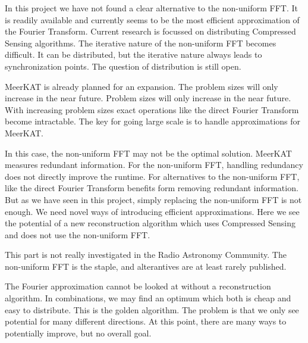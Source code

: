 In this project we have not found a clear alternative to the non-uniform FFT. It is readily available\cite{kunisnonequispaced, offringa2014wsclean} and currently seems to be the most efficient approximation of the Fourier Transform.
 Current research is focussed on distributing Compressed Sensing algorithms\cite{dabbech2018cygnus, pratley2018fast}. The iterative nature of the non-uniform FFT becomes difficult. It can be distributed\cite{kunisnonequispaced}, but the iterative nature always leads to synchronization points. The question of distribution is still open.

MeerKAT is already planned for an expansion. The problem sizes will only increase in the near future. Problem sizes will only increase in the near future. With increasing problem sizes exact operations like the direct Fourier Transform become intractable. The key for going large scale is to handle approximations for MeerKAT.

In this case, the non-uniform FFT may not be the optimal solution. MeerKAT measures redundant information. For the non-uniform FFT, handling redundancy does not directly improve the runtime. For alternatives to the non-uniform FFT, like the direct Fourier Transform benefits form removing redundant information. But as we have seen in this project, simply replacing the non-uniform FFT is not enough. We need novel ways of introducing efficient approximations. Here we see the potential of a new reconstruction algorithm which uses Compressed Sensing and does not use the non-uniform FFT.

This part is not really investigated in the Radio Astronomy Community. The non-uniform FFT is the staple, and alterantives are at least rarely published.

The Fourier approximation cannot be looked at without a reconstruction algorithm. In combinations, we may find an optimum which both is cheap and easy to distribute. This is the golden algorithm. The problem is that we only see potential for many different directions. At this point, there are many ways to potentially improve, but no overall goal.








